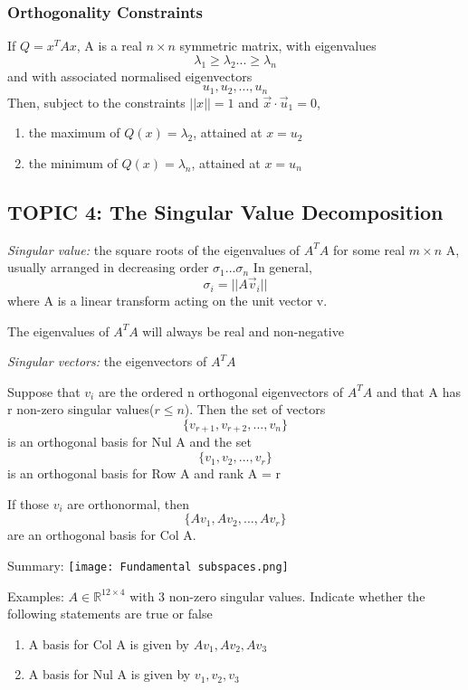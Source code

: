 \documentclass[12pt]{article} %
\newcommand{\R}{\mathbb{R}}
\begin{document}
{\subsubsection{Orthogonality Constraints}
If $Q = x^T A x$, A is a real $n \times n$ symmetric matrix, with eigenvalues 
$$\lambda_1 \geq \lambda_2 ... \geq \lambda_n$$
and with associated normalised eigenvectors
$$u_1, u_2, ..., u_n$$
Then, subject to the constraints $||x|| = 1$ and $\vec{x} \cdot \vec{u}_1 = 0$, 
\begin{enumerate}
	\item the maximum of $Q(x) = \lambda_2$, attained at $x = u_2$
	\item the minimum of $Q(x) = \lambda_n$, attained at $x = u_n$
\end{enumerate}
\subsection{TOPIC 4: The Singular Value Decomposition}
\emph{Singular value:} the square roots of the eigenvalues of $A^T A$ for some real $m \times n$ A, usually arranged in decreasing order $\sigma_1... \sigma_n$
In general, 
$$\sigma_i = ||A\vec{v}_i||$$
where A is a linear transform acting on the unit vector v.

The eigenvalues of $A^T A$ will always be real and non-negative

\emph{Singular vectors:} the eigenvectors of $A^T A$

Suppose that $v_i$ are the ordered n orthogonal eigenvectors of $A^T A$ and that A has r non-zero singular values($r \leq n$). Then the set of vectors 
$$\{v_{r+1}, v_{r+2}, ..., v_n\}$$
is an orthogonal basis for Nul A and the set
$$\{v_1, v_2, ..., v_r\}$$
is an orthogonal basis for Row A and rank A = r

If those $v_i$ are orthonormal, then
$$\{Av_1, Av_2,..., Av_r\}$$
are an orthogonal basis for Col A.

Summary:
\texttt{[image: Fundamental subspaces.png]}

Examples: 
$A \in \R^{12 \times 4}$ with 3 non-zero singular values. Indicate whether the following statements are true or false
\begin{enumerate}
	\item A basis for Col A is given by $Av_1, Av_2, Av_3$
	\item A basis for Nul A is given by $v_1, v_2, v_3$
\end{enumerate}

}
\end{document}
